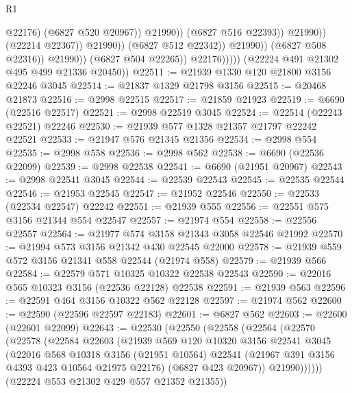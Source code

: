 \begin{lexlean}{R1}
\begin{coremodule}
                                                  @22176)
                                                (@6827 @520 @20967))
                                              @21990))
                                          (@6827 @516 @22393))
                                        @21990))
                                    (@22214 @22367))
                                  @21990))
                              (@6827 @512 @22342))
                            @21990))
                        (@6827 @508 @22316))
                      @21990))
                  (@6827 @504 @22265))
                @22176)))))
      (@22224 @491 @21302 @495 @499 @21336 @20450))
@22511 := @21939 @1330 @120 @21800 @3156 @22246 @3045
@22514 := @21837 @1329 @21798 @3156
@22515 := @20468 @21873
@22516 := @2998 @22515
@22517 := @21859 @21923
@22519 := @6690 (@22516 @22517)
@22521 := @2998 @22519 @3045
@22524 := @22514 (@22243 @22521) @22246
@22530 := @21939 @577 @1328 @21357 @21797 @22242 @22521
@22533 := @21947 @576 @21345 @21356
@22534 := @2998 @554
@22535 := @2998 @558
@22536 := @2998 @562
@22538 := @6690 (@22536 @22099)
@22539 := @2998 @22538
@22541 := @6690 (@21951 @20967)
@22543 := @2998 @22541 @3045
@22544 := @22539 @22543
@22545 := @22535 @22544
@22546 := @21953 @22545
@22547 := @21952 @22546
@22550 := @22533 (@22534 @22547) @22242
@22551 := @21939 @555
@22556 := @22551 @575 @3156 @21344 @554 @22547
@22557 := @21974 @554
@22558 := @22556 @22557
@22564 := @21977 @574 @3158 @21343 @3058 @22546 @21992
@22570 := @21994 @573 @3156 @21342 @430 @22545 @22000
@22578 := @21939 @559 @572 @3156 @21341 @558 @22544 (@21974 @558)
@22579 := @21939 @566
@22584 := @22579 @571 @10325 @10322 @22538 @22543
@22590 := @22016 @565 @10323 @3156 (@22536 @22128) @22538
@22591 := @21939 @563
@22596 := @22591 @464 @3156 @10322 @562 @22128
@22597 := @21974 @562
@22600 := @22590 (@22596 @22597 @22183)
@22601 := @6827 @562
@22603 := @22600 (@22601 @22099)
@22643 := @22530
    (@22550
      (@22558
        (@22564
          (@22570
            (@22578
              (@22584
                @22603
                (@21939
                  @569
                  @120
                  @10320
                  @3156
                  @22541
                  @3045
                  (@22016
                    @568
                    @10318
                    @3156
                    (@21951 @10564)
                    @22541
                    (@21967 @391 @3156 @4393 @423 @10564 @21975 @22176)
                    (@6827 @423 @20967))
                  @21990))))))
      (@22224 @553 @21302 @429 @557 @21352 @21355))

\end{coremodule}
\end{lexlean}
